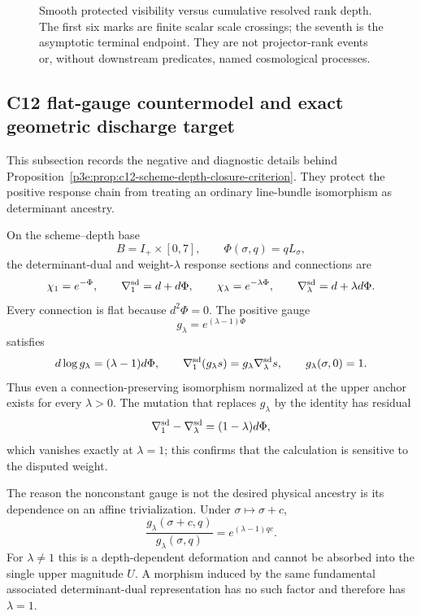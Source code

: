 \documentclass[11pt,a4paper]{article}
\begin{document}
\begin{figure}[H]
\centering
{}
\caption{Smooth protected visibility versus cumulative resolved rank depth.
The first six marks are finite scalar scale crossings; the seventh is the
asymptotic terminal endpoint.  They are not projector-rank events or, without
downstream predicates, named cosmological processes.}
\end{figure}

\subsection{C12 flat-gauge countermodel and exact geometric discharge target}
\label{p3e:app:c12-flat-gauge-countermodel}
This subsection records the negative and diagnostic details behind
Proposition~\ref{p3e:prop:c12-scheme-depth-closure-criterion}.  They protect
the positive response chain from treating an ordinary line-bundle
isomorphism as determinant ancestry.

On the scheme--depth base
\[
 B=I_+\times[0,7],\qquad
 \Phi(\sigma,q)=qL_\sigma,
\]
the determinant-dual and weight-$\lambda$ response sections and connections
are
\[
 \chi_1=e^{-\Phi},\qquad \nabla^{\rm sd}_1=d+d\Phi,
 \qquad
 \chi_\lambda=e^{-\lambda\Phi},\qquad
 \nabla^{\rm sd}_\lambda=d+\lambda d\Phi.
\]
Every connection is flat because $d^2\Phi=0$.  The positive gauge
\[
 g_\lambda=e^{(\lambda-1)\Phi}
\]
satisfies
\[
 d\log g_\lambda=(\lambda-1)d\Phi,
 \qquad
 \nabla^{\rm sd}_1(g_\lambda s)
 =g_\lambda\nabla^{\rm sd}_\lambda s,
 \qquad
 g_\lambda(\sigma,0)=1.
\]
Thus even a connection-preserving isomorphism normalized at the upper anchor
exists for every $\lambda>0$.  The mutation that replaces
$g_\lambda$ by the identity has residual
\[
 \nabla^{\rm sd}_1-\nabla^{\rm sd}_\lambda
 =(1-\lambda)d\Phi,
\]
which vanishes exactly at $\lambda=1$; this confirms that the calculation is
sensitive to the disputed weight.

The reason the nonconstant gauge is not the desired physical ancestry is its
dependence on an affine trivialization.  Under
$\sigma\mapsto\sigma+c$,
\[
 \frac{g_\lambda(\sigma+c,q)}{g_\lambda(\sigma,q)}
 =e^{(\lambda-1)qc}.
\]
For $\lambda\ne1$ this is a depth-dependent deformation and cannot be
absorbed into the single upper magnitude $U$.  A morphism induced by the same
fundamental associated determinant-dual representation has no such factor and
therefore has $\lambda=1$.
\end{document}
